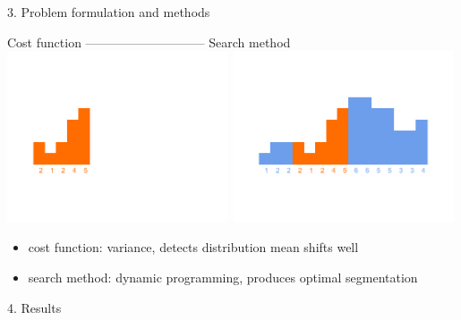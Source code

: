 \documentclass[first=orange,second=blue,logo=blueque]{aaltoslides}
\begin{document}

\begin{frame}{3. Problem formulation and methods}
    \begin{block}{ {\color{black}Cost function} {\color{white}-----------------------------} {\color{black}Search method}}
        \includegraphics[width=0.49\textwidth]{figures/costfunction.pdf}
        \includegraphics[width=0.49\textwidth]{figures/searchmethod.pdf}\\
        \vspace{-1cm} \hspace{0.5cm}
        \color{orange}{$\sigma^2=2,7$}
        \begin{itemize}
            \item \alert{cost function}: variance, detects distribution mean shifts well
            \item \alert{search method}: dynamic programming, produces optimal segmentation
        \end{itemize}
    \end{block}
\end{frame}


\begin{frame}{4. Results}
\end{frame}
\end{document}
